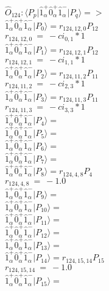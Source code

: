 \documentclass[14pt]{article}
\begin{document}
    $\hat{O}_{124}:  \langle{P_p}\vert \hat{1}_{\alpha}^{+}\hat{0}_{\alpha}^{+}\hat{1}_{\alpha}^{-} \vert{P_q}\rangle => $ \\ 
    $ \hat{1}_{\alpha}^{+}\hat{0}_{\alpha}^{+}\hat{1}_{\alpha}^{-} \vert{P_{0}}\rangle = {r}_{124,12,0}P_{12} $ \\ 
    ${r}_{124,12,0}\ =\ -{ci}_{0,1}*1 $ \\ 
    $ \hat{1}_{\alpha}^{+}\hat{0}_{\alpha}^{+}\hat{1}_{\alpha}^{-} \vert{P_{1}}\rangle = {r}_{124,12,1}P_{12} $ \\ 
    ${r}_{124,12,1}\ =\ -{ci}_{1,1}*1 $ \\ 
    $ \hat{1}_{\alpha}^{+}\hat{0}_{\alpha}^{+}\hat{1}_{\alpha}^{-} \vert{P_{2}}\rangle = {r}_{124,11,2}P_{11} $ \\ 
    ${r}_{124,11,2}\ =\ -{ci}_{2,3}*1 $ \\ 
    $ \hat{1}_{\alpha}^{+}\hat{0}_{\alpha}^{+}\hat{1}_{\alpha}^{-} \vert{P_{3}}\rangle = {r}_{124,11,3}P_{11} $ \\ 
    ${r}_{124,11,3}\ =\ -{ci}_{3,3}*1 $ \\ 
    $ \hat{1}_{\alpha}^{+}\hat{0}_{\alpha}^{+}\hat{1}_{\alpha}^{-} \vert{P_{4}}\rangle =  $ \\ 
    $ \hat{1}_{\alpha}^{+}\hat{0}_{\alpha}^{+}\hat{1}_{\alpha}^{-} \vert{P_{5}}\rangle =  $ \\ 
    $ \hat{1}_{\alpha}^{+}\hat{0}_{\alpha}^{+}\hat{1}_{\alpha}^{-} \vert{P_{6}}\rangle =  $ \\ 
    $ \hat{1}_{\alpha}^{+}\hat{0}_{\alpha}^{+}\hat{1}_{\alpha}^{-} \vert{P_{7}}\rangle =  $ \\ 
    $ \hat{1}_{\alpha}^{+}\hat{0}_{\alpha}^{+}\hat{1}_{\alpha}^{-} \vert{P_{8}}\rangle = {r}_{124,4,8}P_{4} $ \\ 
    ${r}_{124,4,8}\ =\ -1.0 $ \\ 
    $ \hat{1}_{\alpha}^{+}\hat{0}_{\alpha}^{+}\hat{1}_{\alpha}^{-} \vert{P_{9}}\rangle =  $ \\ 
    $ \hat{1}_{\alpha}^{+}\hat{0}_{\alpha}^{+}\hat{1}_{\alpha}^{-} \vert{P_{10}}\rangle =  $ \\ 
    $ \hat{1}_{\alpha}^{+}\hat{0}_{\alpha}^{+}\hat{1}_{\alpha}^{-} \vert{P_{11}}\rangle =  $ \\ 
    $ \hat{1}_{\alpha}^{+}\hat{0}_{\alpha}^{+}\hat{1}_{\alpha}^{-} \vert{P_{12}}\rangle =  $ \\ 
    $ \hat{1}_{\alpha}^{+}\hat{0}_{\alpha}^{+}\hat{1}_{\alpha}^{-} \vert{P_{13}}\rangle =  $ \\ 
    $ \hat{1}_{\alpha}^{+}\hat{0}_{\alpha}^{+}\hat{1}_{\alpha}^{-} \vert{P_{14}}\rangle = {r}_{124,15,14}P_{15} $ \\ 
    ${r}_{124,15,14}\ =\ -1.0 $ \\ 
    $ \hat{1}_{\alpha}^{+}\hat{0}_{\alpha}^{+}\hat{1}_{\alpha}^{-} \vert{P_{15}}\rangle =  $ \\ 
    
\end{document}

